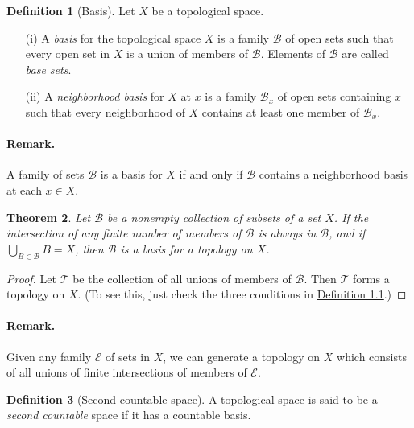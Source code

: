 \documentclass{article}
\numberwithin{equation}{section}
\theoremstyle{plain}
\newtheorem{theorem}{Theorem}[section]
\theoremstyle{definition}
\newtheorem{definition}[theorem]{Definition}
\begin{document}
\begin{definition}[Basis]\label{def:1.17} Let $X$ be a topological space.
\begin{itemize}
\item[(i)] A \textit{basis} for the topological space $X$ is a family $\mathscr{B}$ of open sets such that every open set in $X$ is a union of members of $\mathscr{B}$. Elements of $\mathscr{B}$ are called \textit{base sets}.
\item[(ii)] A \textit{neighborhood basis} for $X$ at $x$ is a family $\mathscr{B}_x$ of open sets containing $x$ such that every neighborhood of $X$ contains at least one member of $\mathscr{B}_x$.
\end{itemize}
\end{definition}

\paragraph{Remark.} A family of sets $\mathscr{B}$ is a basis for $X$ if and only if $\mathscr{B}$ contains a neighborhood basis at each $x\in X$.

\begin{theorem}\label{thm:1.18}
Let $\mathscr{B}$ be a nonempty collection of subsets of a set $X$. If the intersection of any finite number of members of $\mathscr{B}$ is always in $\mathscr{B}$, and if $\bigcup_{B\in\mathscr{B}}B = X$, then $\mathscr{B}$ is a basis for a topology on $X$. 
\end{theorem} 
\begin{proof}
Let $\mathscr{T}$ be the collection of all unions of members of $\mathscr{B}$. Then $\mathscr{T}$ forms a topology on $X$. (To see this, just check the three conditions in \hyperref[def:1.1]{Definition 1.1}.)
\end{proof}

\paragraph{Remark.} Given any family $\mathscr{E}$ of sets in $X$, we can generate a topology on $X$ which consists of all unions of finite intersections of members of $\mathscr{E}$.

\begin{definition}[Second countable space]\label{def:1.19} A topological space is said to be a \textit{second countable} space if it has a countable basis.
\end{definition}
\end{document}
